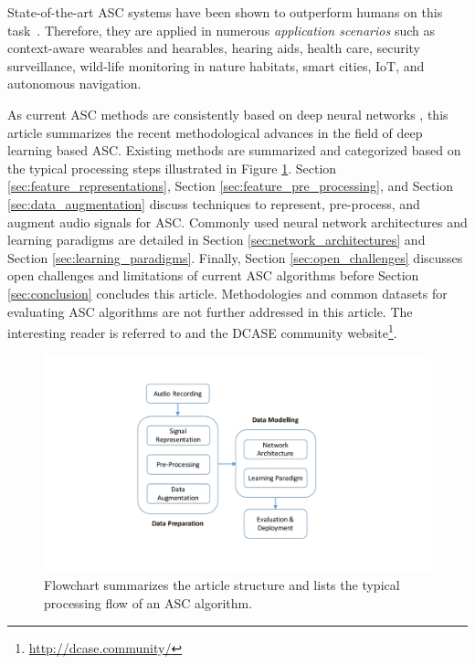 \documentclass[applsci,article,submit,oneauthor,pdftex]{Definitions/mdpi}
\newcommand{\figref}[1]{{Figure \ref{#1}}}
\newcommand{\secref}[1]{{Section \ref{#1}}}
\begin{document}
State-of-the-art ASC systems have been shown to outperform humans on this task~\citep{Mesaros:2017:HumanASC:WASPAA}.
Therefore, they are applied in numerous \textit{application scenarios} such as context-aware  wearables and hearables, hearing aids, 
health care, security surveillance, wild-life monitoring in nature habitats, smart cities, IoT, and autonomous navigation. 

As current ASC methods are consistently based on deep neural networks \citep{Virtanen:2018:SoundSceneBook:BOOK}, this article summarizes the recent methodological advances in the field of deep learning based ASC. Existing methods are summarized and categorized based on the typical processing steps illustrated in 
\figref{fig:flowchart}. \secref{sec:feature_representations},  \secref{sec:feature_pre_processing}, and \secref{sec:data_augmentation} discuss techniques to represent, pre-process, and augment audio signals for ASC.
Commonly used neural network architectures and learning paradigms are detailed in \secref{sec:network_architectures} and \secref{sec:learning_paradigms}.
Finally, \secref{sec:open_challenges} discusses open challenges and limitations of current ASC algorithms before \secref{sec:conclusion} concludes this article.
Methodologies and common datasets for evaluating ASC algorithms are not further addressed in this article. The interesting reader is referred to \citep{Virtanen:2018:SoundSceneBook:BOOK, Mesaros:2016:ASC:IEEE_TASLP} and the DCASE community website\footnote{\url{http://dcase.community/}}.




\begin{figure}[t]
    \centering
    \includegraphics[width=.4\textwidth]{figures/flowchart.pdf}
    \caption{Flowchart summarizes the article structure and lists the typical processing flow of an ASC algorithm.}
\label{fig:flowchart}
\end{figure}
\end{document}
